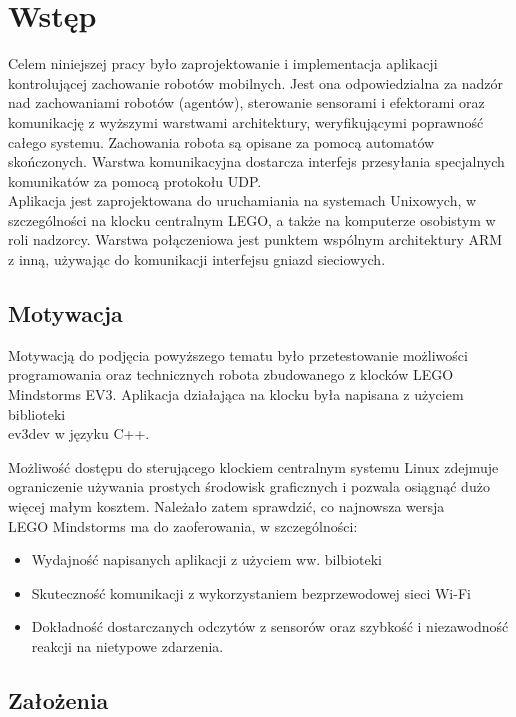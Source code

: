 \chapter{Wstęp}
\label{ch:wstep}

Celem niniejszej pracy było zaprojektowanie i implementacja aplikacji kontrolującej zachowanie robotów mobilnych. Jest ona odpowiedzialna za nadzór nad zachowaniami robotów (agentów), sterowanie sensorami i efektorami oraz komunikację z wyższymi warstwami architektury, weryfikującymi poprawność całego systemu. Zachowania robota są opisane za pomocą automatów skończonych. Warstwa komunikacyjna dostarcza interfejs przesyłania specjalnych komunikatów za pomocą protokołu UDP.\\

Aplikacja jest zaprojektowana do uruchamiania na systemach Unixowych, w szczególności na klocku centralnym LEGO, a także na komputerze osobistym w roli nadzorcy. Warstwa połączeniowa jest punktem wspólnym architektury ARM z inną, używając do komunikacji interfejsu gniazd sieciowych.
\clearpage

\section{Motywacja}

Motywacją do podjęcia powyższego tematu było przetestowanie możliwości programowania oraz technicznych robota zbudowanego z klocków LEGO Mindstorms EV3. Aplikacja działająca na klocku była napisana z użyciem biblioteki\\
ev3dev \cite{ev3dev} w języku C++.

Możliwość dostępu do sterującego klockiem centralnym systemu Linux zdejmuje ograniczenie używania prostych środowisk graficznych i pozwala osiągnąć dużo więcej małym kosztem. Należało zatem sprawdzić, co najnowsza wersja \\LEGO Mindstorms ma do zaoferowania, w szczególności:
\begin{itemize}
    \item Wydajność napisanych aplikacji z użyciem ww. bilbioteki
    \item Skuteczność komunikacji z wykorzystaniem bezprzewodowej sieci Wi-Fi
    \item Dokładność dostarczanych odczytów z sensorów oraz szybkość i niezawodność reakcji na nietypowe zdarzenia.
\end{itemize}

\section{Założenia}

